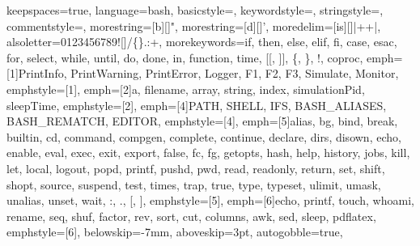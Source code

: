 {%
keepspaces=true,                    %
language=bash,
basicstyle=\ttfamily\small\color{basic-color},
keywordstyle=\color{keywords-color},
stringstyle=\color{strings-color},
commentstyle=\color{comment-color},
morestring=[b][\color{strings-color}]{"},
morestring=[d][\color{strings-color}]{'},
moredelim=[is][\color{basic-color}]{|+}{+|}, %
alsoletter=0123456789![]/\{\}.:+, %
morekeywords={if, then, else, elif, fi, case, esac, for, select, while, until, do, done, in, function, time, [[, ]], \{, \}, !, coproc}, %
emph=[1]{PrintInfo, PrintWarning, PrintError, Logger, F1, F2, F3, Simulate, Monitor},
emphstyle=[1]{\color{functions-color}}, %
emph=[2]{a, filename, array, string, index, simulationPid, sleepTime},
emphstyle=[2]{\color{variables-color}}, %
emph=[4]{PATH, SHELL, IFS, BASH_ALIASES, BASH_REMATCH, EDITOR},
emphstyle=[4]{\color{environment-color}}, %
emph=[5]{alias, bg, bind, break, builtin, cd, command, compgen, complete, continue, declare, dirs, disown, echo, enable, eval,
         exec, exit, export, false, fc, fg, getopts, hash, help, history, jobs, kill, let, local, logout, popd, printf, pushd, pwd,
         read, readonly, return, set, shift, shopt, source, suspend, test, times, trap, true, type, typeset, ulimit, umask,
         unalias, unset, wait, :, ., [, ]},
emphstyle=[5]{\color{builtins-color}}, %
emph=[6]{echo, printf, touch, whoami, rename, seq, shuf, factor, rev, sort, cut, columns, awk, sed, sleep, pdflatex},
emphstyle=[6]{\color{external-color}}, %
%
belowskip=-7mm,
aboveskip=3pt,
autogobble=true, %
}

\def\bash{\lstinline[style=MyBash, basicstyle=\ttfamily\color{black}]}

